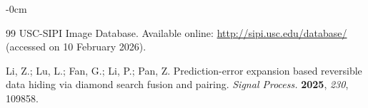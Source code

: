 \documentclass[journal,article,submit,pdftex,moreauthors]{Definitions/mdpi}
\begin{document}
\begin{adjustwidth}{-\extralength}{0cm}
\begin{thebibliography}{99}
USC-SIPI Image Database.
Available online: \url{http://sipi.usc.edu/database/} (accessed on 10 February 2026).

Li, Z.; Lu, L.; Fan, G.; Li, P.; Pan, Z.
Prediction-error expansion based reversible data hiding via diamond search fusion and pairing.
\emph{Signal Process.} \textbf{2025}, \emph{230}, 109858.

\end{thebibliography}
%
%
%
%
%
%
%
%
%
%
%
%
%

\end{adjustwidth}
\end{document}
